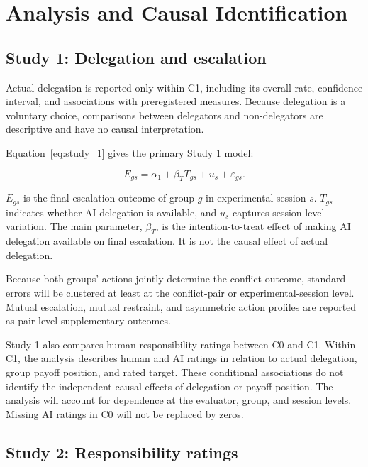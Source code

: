 \documentclass[11pt,a4paper]{article}
\begin{document}
\section{Analysis and Causal Identification}

\subsection{Study 1: Delegation and escalation}

Actual delegation is reported only within C1, including its overall rate, confidence interval, and associations with preregistered measures. Because delegation is a voluntary choice, comparisons between delegators and non-delegators are descriptive and have no causal interpretation.

Equation~\ref{eq:study_1} gives the primary Study 1 model:

\begin{equation}
E_{gs}=\alpha_1+\beta_TT_{gs}+u_s+\varepsilon_{gs}.
\label{eq:study_1}
\end{equation}

$E_{gs}$ is the final escalation outcome of group $g$ in experimental session $s$. $T_{gs}$ indicates whether AI delegation is available, and $u_s$ captures session-level variation. The main parameter, $\beta_T$, is the intention-to-treat effect of making AI delegation available on final escalation. It is not the causal effect of actual delegation.

Because both groups' actions jointly determine the conflict outcome, standard errors will be clustered at least at the conflict-pair or experimental-session level. Mutual escalation, mutual restraint, and asymmetric action profiles are reported as pair-level supplementary outcomes.

Study 1 also compares human responsibility ratings between C0 and C1. Within C1, the analysis describes human and AI ratings in relation to actual delegation, group payoff position, and rated target. These conditional associations do not identify the independent causal effects of delegation or payoff position. The analysis will account for dependence at the evaluator, group, and session levels. Missing AI ratings in C0 will not be replaced by zeros.

\subsection{Study 2: Responsibility ratings}
\end{document}

